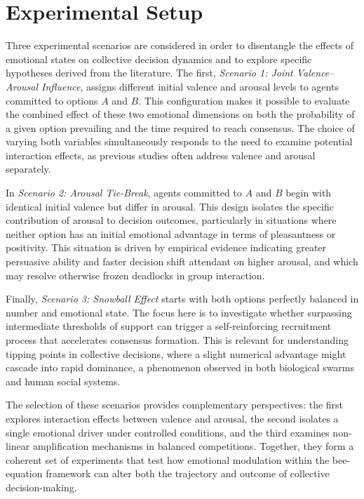 \documentclass[a4paper,twoside]{article}
\begin{document}
\section{Experimental Setup}

Three experimental scenarios are considered in order to disentangle the effects of emotional states on collective decision dynamics and to explore specific hypotheses derived from the literature. The first, \textit{Scenario 1: Joint Valence–Arousal Influence}, assigns different initial valence and arousal levels to agents committed to options $A$ and $B$. This configuration makes it possible to evaluate the combined effect of these two emotional dimensions on both the probability of a given option prevailing and the time required to reach consensus. The choice of varying both variables simultaneously responds to the need to examine potential interaction effects, as previous studies often address valence and arousal separately.

In \textit{Scenario 2: Arousal Tie-Break}, agents committed to $A$ and $B$ begin with identical initial valence but differ in arousal. This design isolates the specific contribution of arousal to decision outcomes, particularly in situations where neither option has an initial emotional advantage in terms of pleasantness or positivity. This situation is driven by empirical evidence indicating greater persuasive ability and faster decision shift attendant on higher arousal, and which may resolve otherwise frozen deadlocks in group interaction.

Finally, \textit{Scenario 3: Snowball Effect} starts with both options perfectly balanced in number and emotional state. The focus here is to investigate whether surpassing intermediate thresholds of support can trigger a self-reinforcing recruitment process that accelerates consensus formation. This is relevant for understanding tipping points in collective decisions, where a slight numerical advantage might cascade into rapid dominance, a phenomenon observed in both biological swarms and human social systems.

The selection of these scenarios provides complementary perspectives: the first explores interaction effects between valence and arousal, the second isolates a single emotional driver under controlled conditions, and the third examines non-linear amplification mechanisms in balanced competitions. Together, they form a coherent set of experiments that test how emotional modulation within the bee-equation framework can alter both the trajectory and outcome of collective decision-making.
\end{document}

